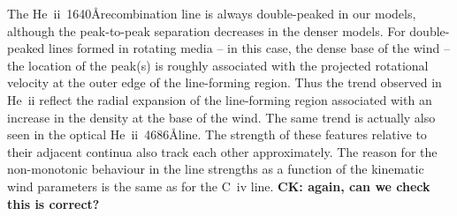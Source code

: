 \documentclass[preprint, a4paper, 11pt]{aastex}
\begin{document}
The He~{\sc ii}~1640\AA recombination line is always double-peaked in
our models, although the peak-to-peak separation decreases in the
denser models. For double-peaked lines
formed in rotating media -- in this case, the dense base of the wind
-- the location of the peak(s) is roughly associated with the
projected rotational velocity at the outer edge of the line-forming
region. Thus the trend observed in He~{\sc ii} reflect the radial
expansion of the line-forming region associated with an increase in
the density at the base of the wind. The same trend is actually also
seen in the optical He~{\sc ii}~4686\AA line. The strength of these
features relative to their adjacent continua also track
each other approximately. The reason for the non-monotonic behaviour
in the line strengths as a function of the kinematic wind parameters
is the same as for the C~{\sc iv} line.
{\bf CK: again, can we check this is correct?}
\end{document}
